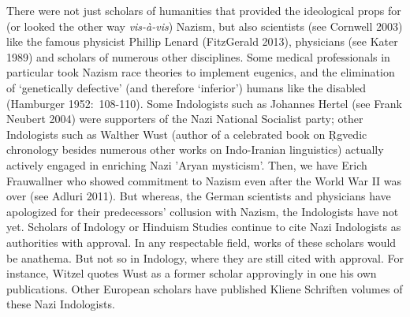 There were not just scholars of humanities that provided the ideological props for (or looked the other way \textit{vis-à-vis}) Nazism, but also scientists (see Cornwell 2003) like the famous physicist Phillip Lenard (FitzGerald 2013), physicians (see Kater 1989) and scholars of numerous other disciplines. Some medical professionals in particular took Nazism race theories to implement eugenics, and the elimination of ‘genetically defective’ (and therefore ‘inferior’) humans like the disabled (Hamburger 1952:~108-110). Some Indologists such as Johannes Hertel (see Frank Neubert 2004) were supporters of the Nazi National Socialist party; other Indologists such as Walther Wust (author of a celebrated book on Ṛgvedic chronology besides numerous other works on Indo-Iranian linguistics) actually actively engaged in enriching Nazi 'Aryan mysticism'. Then, we have Erich Frauwallner who showed commitment to Nazism even after the World War II was over (see Adluri 2011). But whereas, the German scientists and physicians have apologized for their predecessors’ collusion with Nazism, the Indologists have not yet. Scholars of Indology or Hinduism Studies continue to cite Nazi Indologists as authorities with approval. In any respectable field, works of these scholars would be anathema. But not so in Indology, where they are still cited with approval. For instance, Witzel quotes Wust as a former scholar approvingly in one his own publications. Other European scholars have published Kliene Schriften volumes of these Nazi Indologists.

